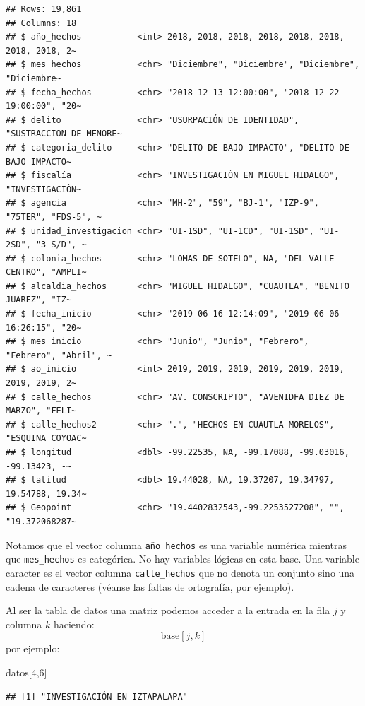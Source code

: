 \documentclass[
]{book}
\newenvironment{Shaded}{\begin{snugshade}}{\end{snugshade}}
\newcommand{\DecValTok}[1]{\textcolor[rgb]{0.00,0.00,0.81}{#1}}
\newcommand{\NormalTok}[1]{#1}
\begin{document}
\begin{verbatim}
## Rows: 19,861
## Columns: 18
## $ año_hechos           <int> 2018, 2018, 2018, 2018, 2018, 2018, 2018, 2018, 2~
## $ mes_hechos           <chr> "Diciembre", "Diciembre", "Diciembre", "Diciembre~
## $ fecha_hechos         <chr> "2018-12-13 12:00:00", "2018-12-22 19:00:00", "20~
## $ delito               <chr> "USURPACIÓN DE IDENTIDAD", "SUSTRACCION DE MENORE~
## $ categoria_delito     <chr> "DELITO DE BAJO IMPACTO", "DELITO DE BAJO IMPACTO~
## $ fiscalía             <chr> "INVESTIGACIÓN EN MIGUEL HIDALGO", "INVESTIGACIÓN~
## $ agencia              <chr> "MH-2", "59", "BJ-1", "IZP-9", "75TER", "FDS-5", ~
## $ unidad_investigacion <chr> "UI-1SD", "UI-1CD", "UI-1SD", "UI-2SD", "3 S/D", ~
## $ colonia_hechos       <chr> "LOMAS DE SOTELO", NA, "DEL VALLE CENTRO", "AMPLI~
## $ alcaldia_hechos      <chr> "MIGUEL HIDALGO", "CUAUTLA", "BENITO JUAREZ", "IZ~
## $ fecha_inicio         <chr> "2019-06-16 12:14:09", "2019-06-06 16:26:15", "20~
## $ mes_inicio           <chr> "Junio", "Junio", "Febrero", "Febrero", "Abril", ~
## $ ao_inicio            <int> 2019, 2019, 2019, 2019, 2019, 2019, 2019, 2019, 2~
## $ calle_hechos         <chr> "AV. CONSCRIPTO", "AVENIDFA DIEZ DE MARZO", "FELI~
## $ calle_hechos2        <chr> ".", "HECHOS EN CUAUTLA MORELOS", "ESQUINA COYOAC~
## $ longitud             <dbl> -99.22535, NA, -99.17088, -99.03016, -99.13423, -~
## $ latitud              <dbl> 19.44028, NA, 19.37207, 19.34797, 19.54788, 19.34~
## $ Geopoint             <chr> "19.4402832543,-99.2253527208", "", "19.372068287~
\end{verbatim}

Notamos que el vector columna \texttt{año\_hechos} es una variable numérica mientras que \texttt{mes\_hechos} es categórica. No hay variables lógicas en esta base. Una variable caracter es el vector columna \texttt{calle\_hechos} que no denota un conjunto sino una cadena de caracteres (véanse las faltas de ortografía, por ejemplo).

Al ser la tabla de datos una matriz podemos acceder a la entrada en la fila \(j\) y columna \(k\) haciendo:
\[
\textrm{base}[j,k]
\]
por ejemplo:

\begin{Shaded}
\begin{Highlighting}[]
\NormalTok{datos[}\DecValTok{4}\NormalTok{,}\DecValTok{6}\NormalTok{]}
\end{Highlighting}
\end{Shaded}

\begin{verbatim}
## [1] "INVESTIGACIÓN EN IZTAPALAPA"
\end{verbatim}
\end{document}
